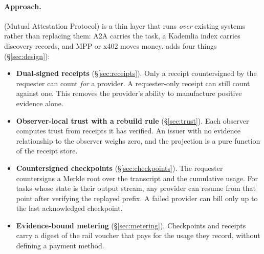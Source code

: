 \paragraph{Approach.}
\sys{} (Mutual Attestation Protocol) is a thin layer that runs \emph{over}
existing systems rather than replacing them: A2A carries the task, a
Kademlia index carries discovery records, and MPP or x402 moves money.
\sys{} adds four things (\S\ref{sec:design}):
\begin{itemize}
\item \textbf{Dual-signed receipts} (\S\ref{sec:receipts}). Only a receipt
  countersigned by the requester can count \emph{for} a provider. A
  requester-only receipt can still count against one. This removes the
  provider's ability to manufacture positive evidence alone.
\item \textbf{Observer-local trust with a rebuild rule} (\S\ref{sec:trust}).
  Each observer computes trust from receipts it has verified. An issuer
  with no evidence relationship to the observer weighs zero, and the
  projection is a pure function of the receipt store.
\item \textbf{Countersigned checkpoints} (\S\ref{sec:checkpoints}). The
  requester countersigns a Merkle root over the transcript and the
  cumulative usage. For tasks whose state is their output stream, any
  provider can resume from that point after verifying the replayed
  prefix. A failed provider can bill only up to the last acknowledged
  checkpoint.
\item \textbf{Evidence-bound metering} (\S\ref{sec:metering}). Checkpoints
  and receipts carry a digest of the rail voucher that pays for the usage
  they record, without \sys{} defining a payment method.
\end{itemize}

